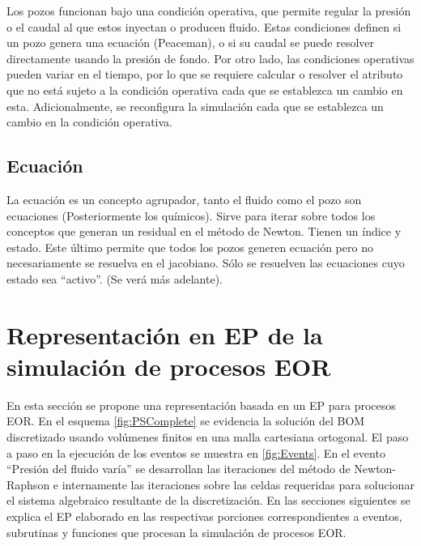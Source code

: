 Los pozos funcionan bajo una condición operativa, que permite regular la presión o el caudal al que estos inyectan o producen fluido. Estas condiciones definen si un pozo genera una ecuación (Peaceman), o si su caudal se puede resolver directamente usando la presión de fondo. Por otro lado, las condiciones operativas pueden variar en el tiempo, por lo que se requiere calcular o resolver el atributo que no está sujeto a la condición operativa cada que se establezca un cambio en esta. Adicionalmente, se reconfigura la simulación cada que se establezca un cambio en la condición operativa.

\subsection{Ecuación}\label{sec:PS_Equation}
La ecuación es un concepto agrupador, tanto el fluido como el pozo son ecuaciones (Posteriormente los químicos). Sirve para iterar sobre todos los conceptos que generan un residual en el método de Newton. Tienen un índice y estado. Este último permite que todos los pozos generen ecuación pero no necesariamente se resuelva en el jacobiano. Sólo se resuelven las ecuaciones cuyo estado sea ``activo''. (Se verá más adelante).


\section{Representación en EP de la simulación de procesos EOR}\label{sec:PS_EOR}
En esta sección se propone una representación basada en un EP para procesos EOR. En el esquema \ref{fig:PSComplete} se evidencia la solución del BOM discretizado usando volúmenes finitos en una malla cartesiana ortogonal. El paso a paso en la ejecución de los eventos se muestra en \ref{fig:Events}.  En el evento ``Presión del fluido varía'' se desarrollan las iteraciones del método de Newton-Raphson e internamente las iteraciones sobre las celdas requeridas para solucionar el sistema algebraico resultante de la discretización. En las secciones siguientes se explica el EP elaborado en las respectivas porciones correspondientes a eventos, subrutinas y funciones que procesan la simulación de procesos EOR. \\

